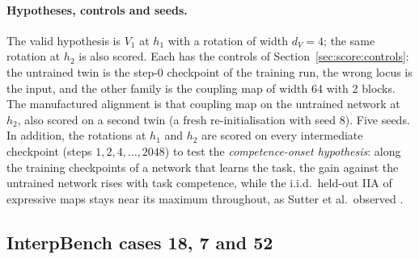 \documentclass[11pt,a4paper]{article}
\newcommand{\dv}{d_V}
\begin{document}
\paragraph{Hypotheses, controls and seeds.} The valid hypothesis is $V_1$ at $h_1$ with a rotation of width $\dv=4$; the same rotation at $h_2$ is also scored. Each has the controls of Section~\ref{sec:score:controls}: the untrained twin is the step-0 checkpoint of the training run, the wrong locus is the input, and the other family is the coupling map of width 64 with 2 blocks. The manufactured alignment is that coupling map on the untrained network at $h_2$, also scored on a second twin (a fresh re-initialisation with seed 8). Five seeds. In addition, the rotations at $h_1$ and $h_2$ are scored on every intermediate checkpoint (steps $1,2,4,\dots,2048$) to test the \emph{competence-onset hypothesis}: along the training checkpoints of a network that learns the task, the gain against the untrained network rises with task competence, while the i.i.d.\ held-out IIA of expressive maps stays near its maximum throughout, as Sutter et al.\ observed \cite{sutter2025}.

\subsection{InterpBench cases 18, 7 and 52}
\label{sec:tb:ib}
\end{document}
